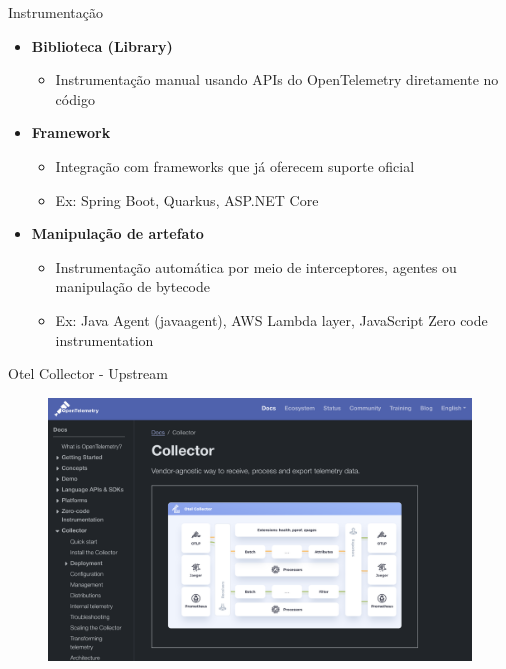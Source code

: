 \documentclass[aspectratio=169]{beamer}
\begin{document}
	\begin{frame}{Instrumentação}
		
		\begin{itemize}
			\item {\faCode} \textbf{Biblioteca (Library)}  
			\begin{itemize}
				\item Instrumentação manual usando APIs do OpenTelemetry diretamente no código
			\end{itemize}
			
			\item {\faCogs} \textbf{Framework}  
			\begin{itemize}
				\item Integração com frameworks que já oferecem suporte oficial
				\item Ex: Spring Boot, Quarkus, ASP.NET Core
			\end{itemize}
			
			\item {\faMagic} \textbf{Manipulação de artefato}  
			\begin{itemize}
				\item Instrumentação automática por meio de interceptores, agentes ou manipulação de bytecode
				\item Ex: Java Agent (javaagent), AWS Lambda layer, JavaScript Zero code instrumentation
			\end{itemize}
		\end{itemize}
		
	\end{frame}
	
	
	\begin{frame}{Otel Collector - Upstream}
		
		\begin{figure}
			\centering
			\includegraphics[width=0.7\linewidth]{Images/otelupstream}
			\label{fig:otelupstream}
		\end{figure}
		
		
	\end{frame}
	
\end{document}
